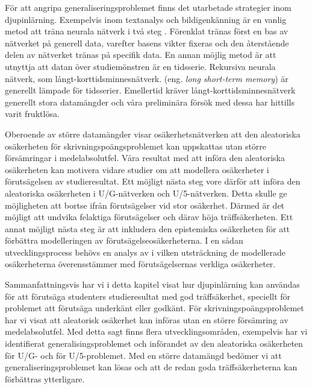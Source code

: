 För att angripa generaliseringsproblemet finns det utarbetade strategier inom djupinlärning. Exempelvis inom textanalys och bildigenkänning är en vanlig metod att träna neurala nätverk i två steg \cite{Chollet}. Förenklat tränas först en bas av nätverket på generell data, varefter basens vikter fixeras och den återstående delen av nätverket tränas på specifik data.
En annan möjlig metod är att utnyttja att datan över studiemönstren är en tidsserie. Rekursiva neurala nätverk, som långt-korttidsminnesnätverk. (eng. \emph{long short-term memory}) \cite{Chollet} är generellt lämpade för tidsserier. Emellertid kräver långt-korttidsminnesnätverk generellt stora datamängder och våra preliminära försök med dessa har hittills varit fruktlösa. 


Oberoende av större datamängder visar osäkerhetsnätverken att den aleatoriska osäkerheten för skrivningspoängsproblemet kan uppskattas utan större försämringar i medelabsolutfel. Våra resultat med att införa den aleatoriska osäkerheten kan motivera vidare studier om att modellera osäkerheter i förutsägelsen av studieresultat. Ett möjligt nästa steg vore därför att införa den aleatoriska osäkerheten i U/G-nätverken och U/5-nätverken. Detta skulle ge möjligheten att bortse ifrån förutsägelser vid stor osäkerhet. Därmed är det möjligt att undvika felaktiga förutsägelser och därav höja träffsäkerheten. Ett annat möjligt nästa steg är att inkludera den epistemiska osäkerheten för att förbättra modelleringen av förutsägelseosäkerheterna. I en sådan utvecklingsprocess behövs en analys av i vilken utsträckning de modellerade osäkerheterna överensstämmer med förutsägelsernas verkliga osäkerheter.

Sammanfattningsvis har vi i detta kapitel visat hur djupinlärning kan användas för att förutsäga studenters studieresultat med god träffsäkerhet, speciellt för problemet att förutsäga underkänt eller godkänt. För skrivningspoängsproblemet har vi visat att aleatorisk osäkerhet kan införas utan en större försämring av medelabsolutfel. Med detta sagt finns flera utvecklingsområden, exempelvis har vi identifierat generalisingsproblemet och införandet av den aleatoriska osäkerheten för U/G- och för U/5-problemet. Med en större datamängd bedömer vi att generaliseringsproblemet kan lösas och att de redan goda träffsäkerheterna kan förbättras ytterligare.

